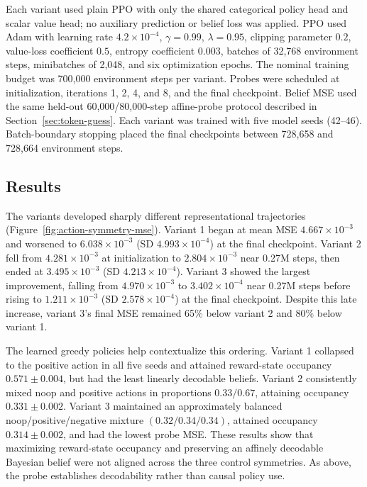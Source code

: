 \documentclass[11pt]{article}
\begin{document}
Each variant used plain PPO with only the shared categorical policy head and
scalar value head; no auxiliary prediction or belief loss was applied. PPO
used Adam with learning rate \(4.2\times10^{-4}\),
\(\gamma=0.99\), \(\lambda=0.95\), clipping parameter \(0.2\), value-loss
coefficient \(0.5\), entropy coefficient \(0.003\), batches of 32,768
environment steps, minibatches of 2,048, and six optimization epochs. The
nominal training budget was 700,000 environment steps per variant. Probes were
scheduled at initialization, iterations 1, 2, 4, and 8, and the final
checkpoint. Belief MSE used the same held-out 60,000/80,000-step affine-probe
protocol described in Section~\ref{sec:token-guess}. Each variant was trained
with five model seeds (42--46). Batch-boundary stopping placed the final
checkpoints between 728,658 and 728,664 environment steps.

\subsection{Results}

The variants developed sharply different representational trajectories
(Figure~\ref{fig:action-symmetry-mse}). Variant 1 began at mean MSE
\(4.667\times10^{-3}\) and worsened to
\(6.038\times10^{-3}\) (SD \(4.993\times10^{-4}\)) at the final checkpoint.
Variant 2 fell from \(4.281\times10^{-3}\) at initialization to
\(2.804\times10^{-3}\) near 0.27M steps, then ended at
\(3.495\times10^{-3}\) (SD \(4.213\times10^{-4}\)). Variant 3 showed the
largest improvement, falling from \(4.970\times10^{-3}\) to
\(3.402\times10^{-4}\) near 0.27M steps before rising to
\(1.211\times10^{-3}\) (SD \(2.578\times10^{-4}\)) at the final checkpoint.
Despite this late increase, variant 3's final MSE remained 65\% below variant
2 and 80\% below variant 1.

The learned greedy policies help contextualize this ordering. Variant 1
collapsed to the positive action in all five seeds and attained reward-state
occupancy \(0.571\pm0.004\), but had the least linearly decodable beliefs.
Variant 2 consistently mixed noop and positive actions in proportions
\(0.33/0.67\), attaining occupancy \(0.331\pm0.002\). Variant 3 maintained an
approximately balanced noop/positive/negative mixture
\((0.32/0.34/0.34)\), attained occupancy \(0.314\pm0.002\), and had the lowest
probe MSE. These results show that maximizing reward-state occupancy and
preserving an affinely decodable Bayesian belief were not aligned across the
three control symmetries. As above, the probe establishes decodability rather
than causal policy use.
\end{document}
